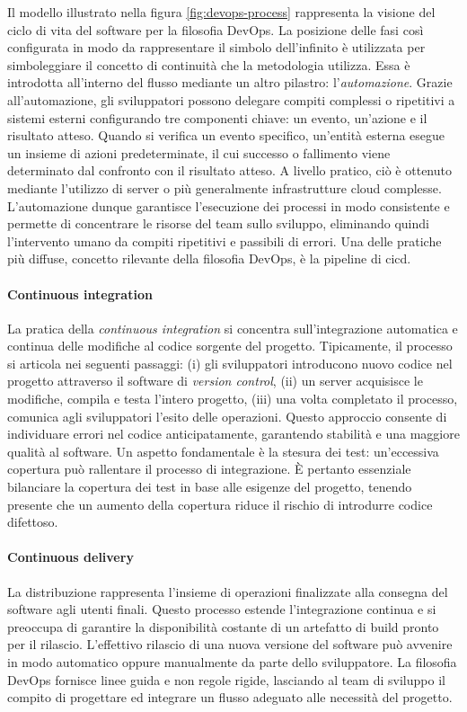 Il modello illustrato nella figura \ref{fig:devops-process} rappresenta la visione del ciclo di vita del software per la filosofia DevOps. La posizione delle fasi così configurata in modo da rappresentare il simbolo dell'infinito è utilizzata per simboleggiare il concetto di continuità che la metodologia utilizza. Essa è introdotta all'interno del flusso mediante un altro pilastro: l'\textit{automazione}. Grazie all'automazione, gli sviluppatori possono delegare compiti complessi o ripetitivi a sistemi esterni configurando tre componenti chiave: un evento, un'azione e il risultato atteso. Quando si verifica un evento specifico, un'entità esterna esegue un insieme di azioni predeterminate, il cui successo o fallimento viene determinato dal confronto con il risultato atteso. A livello pratico, ciò è ottenuto mediante l'utilizzo di server o più generalmente infrastrutture cloud complesse. L'automazione dunque garantisce l'esecuzione dei processi in modo consistente e permette di concentrare le risorse del team sullo sviluppo, eliminando quindi l'intervento umano da compiti ripetitivi e passibili di errori. Una delle pratiche più diffuse, concetto rilevante della filosofia DevOps, è la pipeline di \ac{cicd}.

\paragraph{Continuous integration} La pratica della \textit{continuous integration} si concentra sull'integrazione automatica e continua delle modifiche al codice sorgente del progetto. Tipicamente, il processo si articola nei seguenti passaggi: (i) gli sviluppatori introducono nuovo codice nel progetto attraverso il software di \textit{version control}, (ii) un server acquisisce le modifiche, compila e testa l'intero progetto, (iii) una volta completato il processo, comunica agli sviluppatori l'esito delle operazioni. Questo approccio consente di individuare errori nel codice anticipatamente, garantendo stabilità e una maggiore qualità al software. Un aspetto fondamentale è la stesura dei test: un'eccessiva copertura può rallentare il processo di integrazione. È pertanto essenziale bilanciare la copertura dei test in base alle esigenze del progetto, tenendo presente che un aumento della copertura riduce il rischio di introdurre codice difettoso.

\paragraph{Continuous delivery} La distribuzione rappresenta l'insieme di operazioni finalizzate alla consegna del software agli utenti finali. Questo processo estende l'integrazione continua e si preoccupa di garantire la disponibilità costante di un artefatto di build pronto per il rilascio. L'effettivo rilascio di una nuova versione del software può avvenire in modo automatico oppure manualmente da parte dello sviluppatore. La filosofia DevOps fornisce linee guida e non regole rigide, lasciando al team di sviluppo il compito di progettare ed integrare un flusso adeguato alle necessità del progetto.

